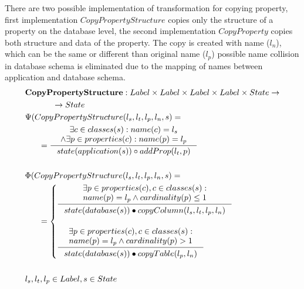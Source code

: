 \documentclass[11pt]{article}
\begin{document}
There are two possible implementation of transformation for copying property, first implementation $CopyPropertyStructure$ copies only the structure of a property on the database level, the second implementation $CopyProperty $ copies both structure and data of the property. The copy is created with name ($l_n$), which can be the same or different than original name ($l_p$) possible name collision in database schema is eliminated due to the mapping of names between application and database schema.
\begin{align*}
&	\mathbf{CopyPropertyStructure} : Label \times Label \times Label  \times Label \times State \rightarrow \\ &  \;\;\;\;\;\;  \;\;\;\;\;\;  \rightarrow State \\
&	\Psi(CopyPropertyStructure(l_s, l_t, l_p, l_n, s) = \\
& \;\;\;\;\;\; =\inference{\exists c \in classes(s) : name(c) = l_s \\ \wedge \exists p \in properties(c) : name(p) = l_p }{state(application(s)) \circ addProp(l_t, p)} 
	\\\\
&	\Phi(CopyPropertyStructure(l_s, l_t, l_p, l_n, s) = \\
& \;\;\;\;\;\; =\begin{cases}
    \inference{\exists p \in properties(c), c \in classes(s) : \\ name(p) = l_p \wedge cardinality(p) \leq 1 }{\begin{gathered}
			state(database(s)) \bullet copyColumn(l_s, l_t, l_p, l_n) 			\end{gathered}} \\ \\
		\inference{\exists p \in properties(c), c \in classes(s) : \\ name(p) = l_p \wedge cardinality(p) > 1}{\begin{gathered}
			state(database(s)) \bullet copyTable(l_p, l_n) 			\end{gathered}}
 \end{cases}\\\\
& l_s, l_t, l_p \in Label, s \in State
\end{align*}
\end{document}

